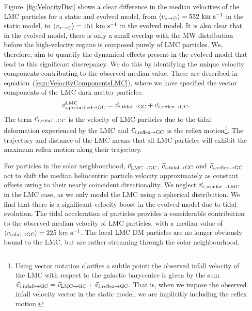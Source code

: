 \documentclass[fleqn,usenatbib]{mnras}
\newcommand{\kms}{{\rm ~km~s^{-1}}}	%
\begin{document}
Figure~\ref{fig:VelocityDist} shows a clear difference in the median velocities of the LMC particles for a static and evolved model, from $\langle v_{\star\to\odot}\rangle=532 \rm \kms$ in the static model, to $\langle v_{\star\to\odot}\rangle=751 \rm \kms$ in the evolved model. It is also clear that in the evolved model, there is only a small overlap with the MW distribution before the high-velocity regime is composed purely of LMC particles. We, therefore, aim to quantify the dynamical effects present in the evolved model that lead to this significant discrepancy. We do this by identifying the unique velocity components contributing to the observed median value. These are described in equation~(\ref{eqn:VelocityComponentsLMC}), where we have specified the vector components of the LMC dark matter particles:
\begin{equation}
\label{eqn:VelocityComponentsLMC}
\vec{v}_{i,{\rm perturbed}\to{\rm GC}}^{\rm LMC} = \vec{v}_{i,{\rm tidal}\to{\rm GC}} + \vec{v}_{i,{\rm reflex}\to{\rm GC}}.
\end{equation}
The term $\vec{v}_{i,{\rm tidal}\to{\rm GC}}$ is the velocity of LMC particles due to the tidal deformation experienced by the LMC and $\vec{v}_{i,{\rm reflex}\to{\rm GC}}$ is the reflex motion\footnote{Using vector notation clarifies a subtle point: the observed infall velocity of the LMC with respect to the galactic barycentre is given by the sum $\vec{v}_{i,{\rm infall}\to{\rm GC}} = \vec{v}_{{\rm LMC}\to{\rm GC}} + \vec{v}_{i,{\rm reflex}\to{\rm GC}}$. That is, when we impose the observed infall velocity vector in the static model, we are implicitly including the reflex motion.}.
The trajectory and distance of the LMC means that all LMC particles will exhibit the maximum reflex motion along their trajectory.

For particles in the solar neighbourhood, $\vec{v}_{{\rm LMC}\to{\rm GC}}$, $\vec{v}_{i,{\rm tidal}\to{\rm GC}}$ and $\vec{v}_{i,{\rm reflex}\to{\rm GC}}$ act to shift the median heliocentric particle velocity approximately as constant offsets owing to their nearly coincident directionality. We neglect $\vec{v}_{i,{\rm secular}\to{\rm LMC}}$ in the LMC case, as we only model the LMC using a spherical distribution. We find that there is a significant velocity boost in the evolved model due to tidal evolution. The tidal acceleration of particles provides a considerable contribution to the observed median velocity of LMC particles, with a median value of $\langle v_{{\rm tidal}\to{\rm GC}}\rangle=225\kms$. The local LMC DM particles are no longer obviously bound to the LMC, but are rather streaming through the solar neighbourhood.
\end{document}
